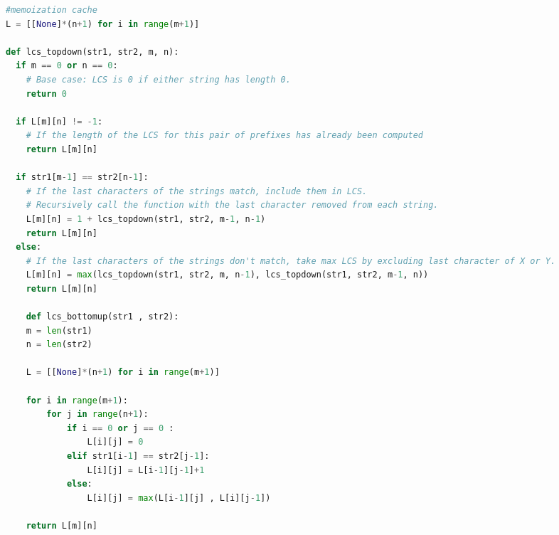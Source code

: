 \documentclass[letterpaper, 8pt]{extarticle}
\makeatletter
\renewcommand{\subsection}{\@startsection{subsection}{2}{0mm}%
                                {-1explus -.5ex minus -.2ex}%
                                {0.5ex plus .2ex}%
                                {\normalfont\small\bfseries}}
\makeatother
\begin{document}
\begin{multicols*}{5}
\begin{lstlisting}[language=Python]
#memoization cache
L = [[None]*(n+1) for i in range(m+1)]

def lcs_topdown(str1, str2, m, n):
  if m == 0 or n == 0:
    # Base case: LCS is 0 if either string has length 0.
    return 0
  
  if L[m][n] != -1:
    # If the length of the LCS for this pair of prefixes has already been computed
    return L[m][n]
  
  if str1[m-1] == str2[n-1]:
    # If the last characters of the strings match, include them in LCS.
    # Recursively call the function with the last character removed from each string.
    L[m][n] = 1 + lcs_topdown(str1, str2, m-1, n-1)
    return L[m][n]
  else:
    # If the last characters of the strings don't match, take max LCS by excluding last character of X or Y.
    L[m][n] = max(lcs_topdown(str1, str2, m, n-1), lcs_topdown(str1, str2, m-1, n))
    return L[m][n]

    def lcs_bottomup(str1 , str2): 
    m = len(str1) 
    n = len(str2) 

    L = [[None]*(n+1) for i in range(m+1)] 

    for i in range(m+1): 
        for j in range(n+1): 
            if i == 0 or j == 0 : 
                L[i][j] = 0
            elif str1[i-1] == str2[j-1]: 
                L[i][j] = L[i-1][j-1]+1
            else: 
                L[i][j] = max(L[i-1][j] , L[i][j-1]) 

    return L[m][n] 
\end{lstlisting}

\end{multicols*}
\end{document}
